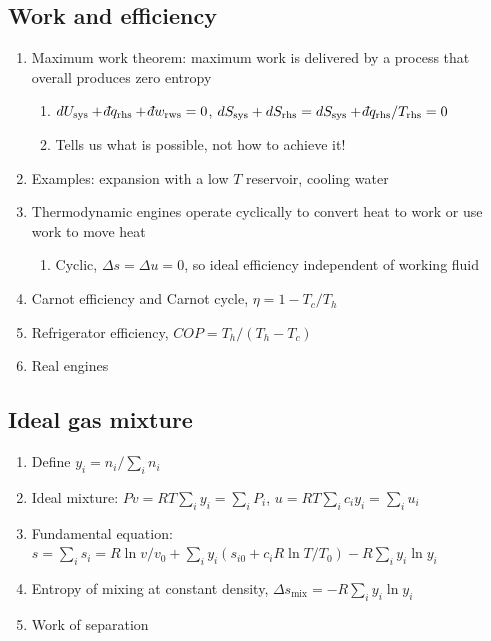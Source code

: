 \documentclass[11pt]{article}
\def\dbar{{\mathchar'26\mkern-12mu d}}
\begin{document}
\subsection{Work and efficiency}
\label{sec:orgf459bed}
\begin{enumerate}
\item Maximum work theorem: maximum work is delivered by a process that overall
produces zero entropy
\begin{enumerate}
\item \(dU_\text{sys}+\dbar q_\text{rhs} +\dbar w_\text{rws} =0\),
\(dS_\text{sys} + dS_\text{rhs}=dS_\text{sys} + \dbar q_\text{rhs}/T_\text{rhs}=0\)
\item Tells us what is possible, not how to achieve it!
\end{enumerate}
\item Examples: expansion with a low \(T\) reservoir, cooling water
\item Thermodynamic engines operate cyclically to convert heat to work or use work to move heat
\begin{enumerate}
\item Cyclic, \(\Delta s = \Delta u =0\), so ideal efficiency
independent of working fluid
\end{enumerate}
\item Carnot efficiency and Carnot cycle, \(\eta =1 - T_c/T_h\)
\item Refrigerator efficiency, \(COP = T_h/(T_h - T_c)\)
\item Real engines
\end{enumerate}

\subsection{Ideal gas mixture}
\label{sec:org4aa68e4}
\begin{enumerate}
\item Define \(y_i = n_i/\sum_i n_i\)
\item Ideal mixture: \(P v = R T \sum_i y_i = \sum_i P_i\), \(u= RT \sum_i c_i y_i =\sum_i u_i\)
\item Fundamental equation: \(s = \sum_i s_i = R \ln v/v_0 + \sum_i y_i (s_{i0} + c_i R\ln T/T_0 ) - R \sum_i y_i \ln y_i\)
\item Entropy of mixing at constant density, \(\Delta s_\text{mix} = -R \sum_i y_i \ln y_i\)
\item Work of separation
\end{enumerate}
\end{document}

